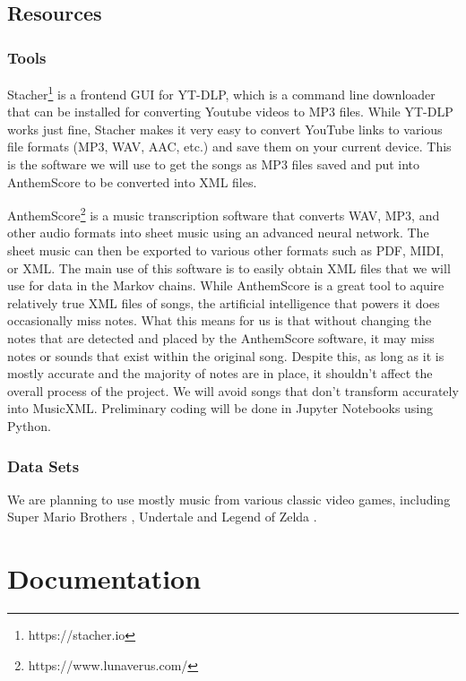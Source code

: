 \documentclass{article}
\begin{document}
\subsection{Resources}
\subsubsection{Tools}
Stacher\footnote{https://stacher.io} is a frontend GUI for YT-DLP, which is a command line downloader that can be installed for converting Youtube videos to MP3 files.
While YT-DLP works just fine, Stacher makes it very easy to convert YouTube links to various file formats (MP3, WAV, AAC, etc.) and save them on your current device. This 
is the software we will use to get the songs as MP3 files saved and put into AnthemScore to be converted into XML files.

AnthemScore\footnote{https://www.lunaverus.com/} is a music transcription software that converts WAV, MP3, and other audio formats into sheet music using an advanced 
neural network. The sheet music can then be exported to various other formats such as PDF, MIDI, or XML. The main use of this software is to easily obtain XML files that 
we will use for data in the Markov chains. While AnthemScore is a great tool to aquire relatively true XML files of songs, the artificial intelligence that powers it does 
occasionally miss notes. What this means for us is that without changing the notes that are detected and placed by the AnthemScore software, it may miss notes or sounds 
that exist within the original song. Despite this, as long as it is mostly accurate and the majority of notes are in place, it shouldn't affect the overall process of the 
project. We will avoid songs that don't transform accurately into MusicXML. Preliminary coding will be done in Jupyter Notebooks using Python. 

\subsubsection{Data Sets}
We are planning to use mostly music from various classic video games, including Super Mario Brothers \cite{kondo_2009},
Undertale \cite{fox_2017} and Legend of Zelda \cite{nakatsuka_2009}.

\section{Documentation}
\end{document}

